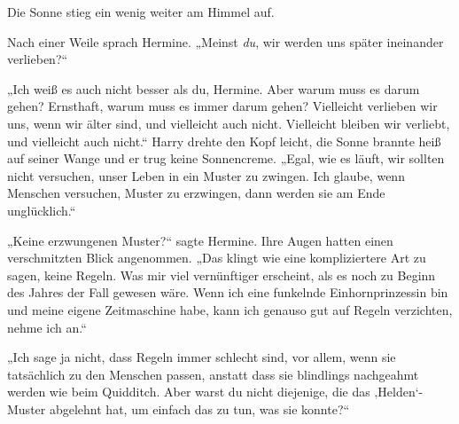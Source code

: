 Die Sonne stieg ein wenig weiter am Himmel auf.

Nach einer Weile sprach Hermine.
„Meinst \emph{du}, wir werden uns später ineinander verlieben?“

„Ich weiß es auch nicht besser als du, Hermine. Aber warum muss es darum gehen? Ernsthaft, warum muss es immer darum gehen? Vielleicht verlieben wir uns, wenn wir älter sind, und vielleicht auch nicht. Vielleicht bleiben wir verliebt, und vielleicht auch nicht.“
Harry drehte den Kopf leicht, die Sonne brannte heiß auf seiner Wange und er trug keine Sonnencreme.
„Egal, wie es läuft, wir sollten nicht versuchen, unser Leben in ein Muster zu zwingen. Ich glaube, wenn Menschen versuchen, Muster zu erzwingen, dann werden sie am Ende unglücklich.“

„Keine erzwungenen Muster?“ sagte Hermine.
Ihre Augen hatten einen verschmitzten Blick angenommen.
„Das klingt wie eine kompliziertere Art zu sagen, keine Regeln. Was mir viel vernünftiger erscheint, als es noch zu Beginn des Jahres der Fall gewesen wäre. Wenn ich eine funkelnde Einhornprinzessin bin und meine eigene Zeitmaschine habe, kann ich genauso gut auf Regeln verzichten, nehme ich an.“

„Ich sage ja nicht, dass Regeln immer schlecht sind, vor allem, wenn sie tatsächlich zu den Menschen passen, anstatt dass sie blindlings nachgeahmt werden wie beim Quidditch. Aber warst du nicht diejenige, die das ‚Helden‘-Muster abgelehnt hat, um einfach das zu tun, was sie konnte?“

